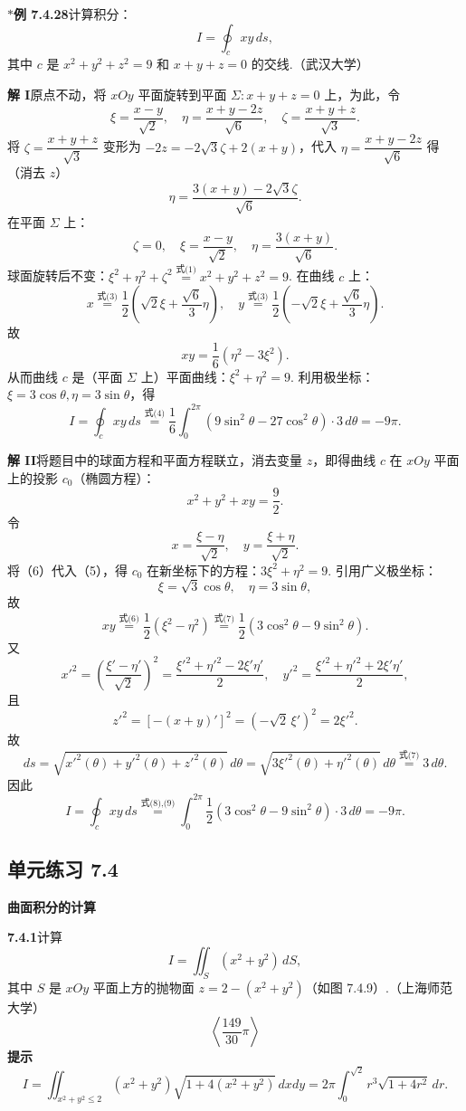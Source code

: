 \documentclass[UTF8, 12pt, fontset=fandol, oneside]{ctexart}
\providecommand{\xlongequal}[1]{\overset{#1}{=}}
\begin{document}
\noindent\textbf{$*$例 7.4.28}\quad 计算积分：
\[
I=\oint_c xy\,ds,
\]
其中 $c$ 是 $x^2+y^2+z^2=9$ 和 $x+y+z=0$ 的交线.（武汉大学）

\noindent\textbf{解 I}\quad 原点不动，将 $xOy$ 平面旋转到平面 $\Sigma:x+y+z=0$ 上，为此，令
\[
\xi=\frac{x-y}{\sqrt2},\quad \eta=\frac{x+y-2z}{\sqrt6},\quad \zeta=\frac{x+y+z}{\sqrt3}. \tag{1}
\]
将 $\zeta=\dfrac{x+y+z}{\sqrt3}$ 变形为 $-2z=-2\sqrt3\zeta+2(x+y)$，代入 $\eta=\dfrac{x+y-2z}{\sqrt6}$ 得（消去 $z$）
\[
\eta=\frac{3(x+y)-2\sqrt3\zeta}{\sqrt6}. \tag{2}
\]
在平面 $\Sigma$ 上：
\[
\zeta=0,\quad \xi=\frac{x-y}{\sqrt2},\quad \eta=\frac{3(x+y)}{\sqrt6}. \tag{3}
\]
球面旋转后不变：$\xi^2+\eta^2+\zeta^2\xlongequal{\text{式(1)}}x^2+y^2+z^2=9$. 在曲线 $c$ 上：
\[
x\xlongequal{\text{式(3)}}\frac12\left(\sqrt2\xi+\frac{\sqrt6}{3}\eta\right),\quad
y\xlongequal{\text{式(3)}}\frac12\left(-\sqrt2\xi+\frac{\sqrt6}{3}\eta\right).
\]
故
\[
xy=\frac16(\eta^2-3\xi^2). \tag{4}
\]
从而曲线 $c$ 是（平面 $\Sigma$ 上）平面曲线：$\xi^2+\eta^2=9$. 利用极坐标：$\xi=3\cos\theta,\eta=3\sin\theta$，得
\[
I=\oint_cxy\,ds\xlongequal{\text{式(4)}}\frac16\int_0^{2\pi}(9\sin^2\theta-27\cos^2\theta)\cdot3\,d\theta=-9\pi.
\]

\noindent\textbf{解 II}\quad 将题目中的球面方程和平面方程联立，消去变量 $z$，即得曲线 $c$ 在 $xOy$ 平面上的投影 $c_0$（椭圆方程）：
\[
x^2+y^2+xy=\frac92. \tag{5}
\]
令
\[
x=\frac{\xi-\eta}{\sqrt2},\quad y=\frac{\xi+\eta}{\sqrt2}. \tag{6}
\]
将（6）代入（5），得 $c_0$ 在新坐标下的方程：$3\xi^2+\eta^2=9$. 引用广义极坐标：
\[
\xi=\sqrt3\cos\theta,\quad \eta=3\sin\theta, \tag{7}
\]
故
\[
xy\xlongequal{\text{式(6)}}\frac12(\xi^2-\eta^2)
\xlongequal{\text{式(7)}}\frac12(3\cos^2\theta-9\sin^2\theta). \tag{8}
\]
又
\[
x'^2=\left(\frac{\xi'-\eta'}{\sqrt2}\right)^2
=\frac{\xi'^2+\eta'^2-2\xi'\eta'}2,\quad
y'^2=\frac{\xi'^2+\eta'^2+2\xi'\eta'}2,
\]
且
\[
z'^2=[-(x+y)']^2=(-\sqrt2\,\xi')^2=2\xi'^2.
\]
故
\[
ds=\sqrt{x'^2(\theta)+y'^2(\theta)+z'^2(\theta)}\,d\theta
=\sqrt{3\xi'^2(\theta)+\eta'^2(\theta)}\,d\theta
\xlongequal{\text{式(7)}}3\,d\theta. \tag{9}
\]
因此
\[
I=\oint_cxy\,ds\xlongequal{\text{式(8),(9)}}\int_0^{2\pi}\frac12(3\cos^2\theta-9\sin^2\theta)\cdot3\,d\theta=-9\pi.
\]

\subsection*{单元练习 7.4}

\noindent\textbf{曲面积分的计算}

\noindent\textbf{7.4.1}\quad 计算
\[
I=\iint_S(x^2+y^2)\,dS,
\]
其中 $S$ 是 $xOy$ 平面上方的抛物面 $z=2-(x^2+y^2)$（如图 7.4.9）.（上海师范大学）
\[
\left\langle \frac{149}{30}\pi\right\rangle
\]
\noindent\textbf{提示}\quad
\[
I=\iint_{x^2+y^2\le2}(x^2+y^2)\sqrt{1+4(x^2+y^2)}\,dxdy
=2\pi\int_0^{\sqrt2}r^3\sqrt{1+4r^2}\,dr.
\]
\end{document}
